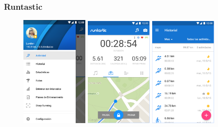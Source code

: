 \documentclass[a4paper, 11pt]{article}
\begin{document}
          \subsubsection{Runtastic}






              \begin{figure}[H]
                  \centering
                  \includegraphics[width=0.3\textwidth]{runtastic1}
                  \includegraphics[width=0.3\textwidth]{runtastic2}
                  \includegraphics[width=0.3\textwidth]{runtastic3}

\end{figure}
\end{document}
